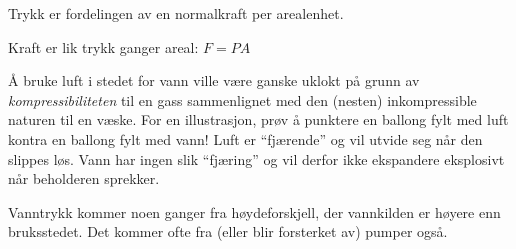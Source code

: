 
Trykk er fordelingen av en normalkraft per arealenhet.

\vskip 10pt

Kraft er lik trykk ganger areal: $F = PA$

\vskip 10pt

Å bruke luft i stedet for vann ville være ganske uklokt på grunn av {\it kompressibiliteten} til en gass sammenlignet med den (nesten) inkompressible naturen til en væske.  For en illustrasjon, prøv å punktere en ballong fylt med luft kontra en ballong fylt med vann!  Luft er ``fjærende'' og vil utvide seg når den slippes løs.  Vann har ingen slik ``fjæring'' og vil derfor ikke ekspandere eksplosivt når beholderen sprekker.

\vskip 10pt

Vanntrykk kommer noen ganger fra høydeforskjell, der vannkilden er høyere enn bruksstedet.  Det kommer ofte fra (eller blir forsterket av) pumper også.


